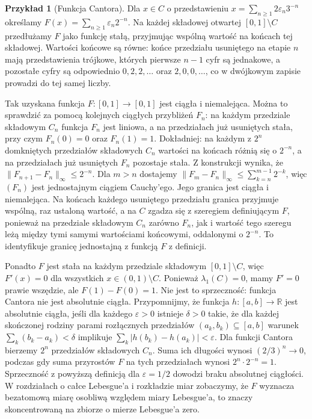 \documentclass[11pt,a4paper,oneside]{book}
\numberwithin{equation}{chapter}
\theoremstyle{plain}
\theoremstyle{definition}
\newtheorem{przyklad}[twierdzenie]{Przykład}
\theoremstyle{remark}
\begin{document}
\begin{przyklad}[Funkcja Cantora]
\label{ex:cantor-function}
Dla $x\in C$ o przedstawieniu
$x=\sum_{n\ge1}2\varepsilon_n3^{-n}$ określamy
$F(x)=\sum_{n\ge1}\varepsilon_n2^{-n}$.
Na każdej składowej otwartej $[0,1]\setminus C$
przedłużamy $F$ jako funkcję stałą, przyjmując
wspólną wartość na końcach tej składowej.
Wartości końcowe są równe: końce przedziału
usuniętego na etapie $n$ mają przedstawienia
trójkowe, których pierwsze $n-1$ cyfr są jednakowe,
a pozostałe cyfry są odpowiednio $0,2,2,\ldots$
oraz $2,0,0,\ldots$, co w dwójkowym zapisie
prowadzi do tej samej liczby.

Tak uzyskana funkcja $F:[0,1]\to[0,1]$
jest ciągła i niemalejąca. Można to sprawdzić za
pomocą kolejnych ciągłych przybliżeń $F_n$:
na każdym przedziale składowym $C_n$ funkcja $F_n$
jest liniowa, a na przedziałach już usuniętych
stała, przy czym $F_n(0)=0$ oraz $F_n(1)=1$.
Dokładniej: na każdym z $2^n$ domkniętych przedziałów
składowych $C_n$ wartości na końcach różnią się o
$2^{-n}$, a na przedziałach już usuniętych $F_n$
pozostaje stała. Z konstrukcji wynika, że
$\|F_{n+1}-F_n\|_\infty\le 2^{-n}$.
Dla $m>n$ dostajemy
$\|F_m-F_n\|_\infty\le\sum_{k=n}^{m-1}2^{-k}$,
więc $(F_n)$ jest jednostajnym ciągiem Cauchy'ego.
Jego granica jest ciągła i niemalejąca. Na końcach
każdego usuniętego przedziału granica przyjmuje
wspólną, raz ustaloną wartość, a na $C$ zgadza się
z szeregiem definiującym $F$, ponieważ na przedziale
składowym $C_n$ zarówno $F_n$, jak i wartość tego
szeregu leżą między tymi samymi wartościami końcowymi,
oddalonymi o $2^{-n}$. To identyfikuje granicę
jednostajną z funkcją $F$ z definicji.

Ponadto $F$ jest stała na każdym przedziale
składowym $[0,1]\setminus C$, więc $F'(x)=0$
dla wszystkich $x\in(0,1)\setminus C$.
Ponieważ $\lambda_1(C)=0$, mamy $F'=0$
prawie wszędzie, ale $F(1)-F(0)=1$.
Nie jest to sprzeczność: funkcja Cantora nie jest
absolutnie ciągła. Przypomnijmy, że funkcja
$h:[a,b]\to\mathbb R$ jest absolutnie ciągła, jeśli
dla każdego $\varepsilon>0$ istnieje $\delta>0$
takie, że dla każdej skończonej rodziny parami
rozłącznych przedziałów $(a_k,b_k)\subseteq[a,b]$
warunek $\sum_k(b_k-a_k)<\delta$ implikuje
$\sum_k|h(b_k)-h(a_k)|<\varepsilon$.
Dla funkcji Cantora bierzemy $2^n$ przedziałów
składowych $C_n$. Suma ich długości wynosi
$(2/3)^n\to0$, podczas gdy suma przyrostów $F$
na tych przedziałach wynosi
$2^n\cdot2^{-n}=1$. Sprzeczność z powyższą definicją
dla $\varepsilon=1/2$ dowodzi braku absolutnej ciągłości.
W rozdziałach o całce Lebesgue'a i rozkładzie miar
zobaczymy, że $F$ wyznacza bezatomową miarę
osobliwą względem miary Lebesgue'a, to znaczy
skoncentrowaną na zbiorze o mierze Lebesgue'a zero.
\end{przyklad}
\end{document}
